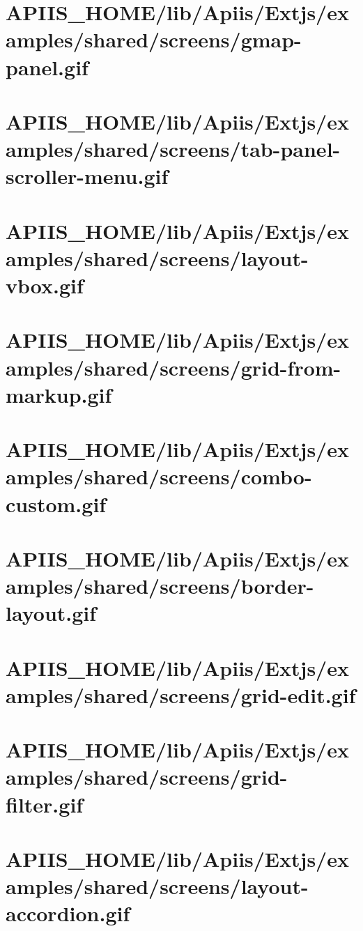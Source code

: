 \section{APIIS\_HOME/lib/Apiis/Extjs/examples/shared/screens/gmap-panel.gif} 
\section{APIIS\_HOME/lib/Apiis/Extjs/examples/shared/screens/tab-panel-scroller-menu.gif} 
\section{APIIS\_HOME/lib/Apiis/Extjs/examples/shared/screens/layout-vbox.gif} 
\section{APIIS\_HOME/lib/Apiis/Extjs/examples/shared/screens/grid-from-markup.gif} 
\section{APIIS\_HOME/lib/Apiis/Extjs/examples/shared/screens/combo-custom.gif} 
\section{APIIS\_HOME/lib/Apiis/Extjs/examples/shared/screens/border-layout.gif} 
\section{APIIS\_HOME/lib/Apiis/Extjs/examples/shared/screens/grid-edit.gif} 
\section{APIIS\_HOME/lib/Apiis/Extjs/examples/shared/screens/grid-filter.gif} 
\section{APIIS\_HOME/lib/Apiis/Extjs/examples/shared/screens/layout-accordion.gif} 
